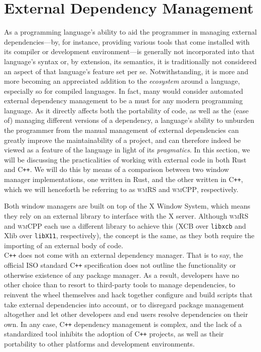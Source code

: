 \section{External Dependency Management}

As a programming  language's ability to aid the programmer  in managing external
dependencies---by,  for instance,  providing various  tools that  come installed
with  its compiler  or development  environment---is generally  not incorporated
into that language's syntax or, by extension, its semantics, it is traditionally
not considered an aspect of that language's feature set per se. Notwithstanding,
it is more  and more becoming an appreciated addition  to the \textit{ecosystem}
around a  language, especially so  for compiled  languages. In fact,  many would
consider automated  external dependency management to  be a must for  any modern
programming language.  As it directly affects  both the portability of  code, as
well as the (ease of) managing  different versions of a dependency, a language's
ability  to unburden  the  programmer  from the  manual  management of  external
dependencies  can greatly  improve the  maintainability  of a  project, and  can
therefore  indeed be  viewed  as a  feature  of  the language  in  light of  its
\textit{pragmatics}. In this  section, we will be  discussing the practicalities
of working with external code in both  Rust and C\texttt{++}. We will do this by
means of a comparison between two window manager implementations, one written in
Rust,  and the  other  written  in C\texttt{++},  which  we  will henceforth  be
referring to as \textsc{wmRS} and \textsc{wmCPP}, respectively.

Both  window managers  are built  on top  of the  X Window  System, which  means
they  rely on  an external  library  to interface  with the  X server.  Although
\textsc{wmRS} and  \textsc{wmCPP} each use  a different library to  achieve this
(XCB  over \texttt{libxcb}  and  Xlib over  \texttt{libX11}, respectively),  the
concept is the same,  as they both require the importing of  an external body of
code.\\

C\texttt{++} does not come with an  external dependency manager. That is to say,
the  official  ISO  standard C\texttt{++}  specification\cite{cppstd}  does  not
outline the  functionality or otherwise existence  of any package manager.  As a
result, developers have  no other choice than to resort  to third-party tools to
manage  dependencies,  to  reinvent  the  wheel  themselves  and  hack  together
configure and build scripts that take  external dependencies into account, or to
disregard package management  altogether and let other developers  and end users
resolve  dependencies  on  their  own.  In  any  case,  C\texttt{++}  dependency
management is complex, and the lack of a standardized tool inhibits the adoption
of C\texttt{++}  projects, as well as  their portability to other  platforms and
development environments.

